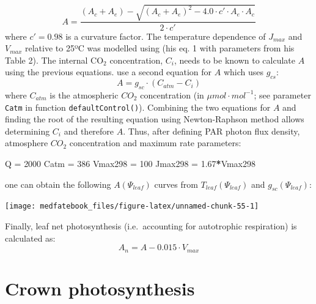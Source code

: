 \documentclass[]{book}
\newenvironment{Shaded}{\begin{snugshade}}{\end{snugshade}}
\newcommand{\DecValTok}[1]{\textcolor[rgb]{0.00,0.00,0.81}{#1}}
\newcommand{\FloatTok}[1]{\textcolor[rgb]{0.00,0.00,0.81}{#1}}
\newcommand{\StringTok}[1]{\textcolor[rgb]{0.31,0.60,0.02}{#1}}
\newcommand{\OperatorTok}[1]{\textcolor[rgb]{0.81,0.36,0.00}{\textbf{#1}}}
\newcommand{\NormalTok}[1]{#1}
\begin{document}
\begin{equation}
A = \frac{(A_c+A_e)-\sqrt{(A_c+A_e)^2-4.0\cdot c'\cdot A_e\cdot A_c}}{2\cdot c'}
\end{equation}
where \(c'=0.98\) is a curvature factor. The temperature dependence of \(J_{max}\) and \(V_{max}\) relative to 25ºC was modelled using \citet{Leuning2002} (his eq. 1 with parameters from his Table 2). The internal CO\(_2\) concentration, \(C_i\), needs to be known to calculate \(A\) using the previous equations. \citet{Sperry2016a} use a second equation for \(A\) which uses \(g_{cs}\):
\begin{equation}
A = g_{sc} \cdot (C_{atm}-C_i)
\end{equation}
where \(C_{atm}\) is the atmospheric \(CO_{2}\) concentration (in \(\mu mol \cdot mol^{-1}\); see parameter \texttt{Catm} in function \texttt{defaultControl()}). Combining the two equations for \(A\) and finding the root of the resulting equation using Newton-Raphson method allows determining \(C_i\) and therefore \(A\). Thus, after defining PAR photon flux density, atmosphere \(CO_{2}\) concentration and maximum rate parameters:

\begin{Shaded}
\begin{Highlighting}[]
\NormalTok{Q =}\StringTok{ }\DecValTok{2000}
\NormalTok{Catm =}\StringTok{ }\DecValTok{386}
\NormalTok{Vmax298 =}\StringTok{ }\DecValTok{100}
\NormalTok{Jmax298 =}\StringTok{ }\FloatTok{1.67}\OperatorTok{*}\NormalTok{Vmax298}
\end{Highlighting}
\end{Shaded}

one can obtain the following \(A(\Psi_{leaf})\) curves from \(T_{leaf}(\Psi_{leaf})\) and \(g_{sc}(\Psi_{leaf})\):

\begin{center}\texttt{[image: medfatebook\_files/figure-latex/unnamed-chunk-55-1]} \end{center}

Finally, leaf net photosynthesis (i.e.~accounting for autotrophic respiration) is calculated as:
\begin{equation}
A_n = A - 0.015 \cdot V_{max}
\end{equation}

\hypertarget{crown-photosynthesis}{%
\section{Crown photosynthesis}\label{crown-photosynthesis}}
\end{document}
